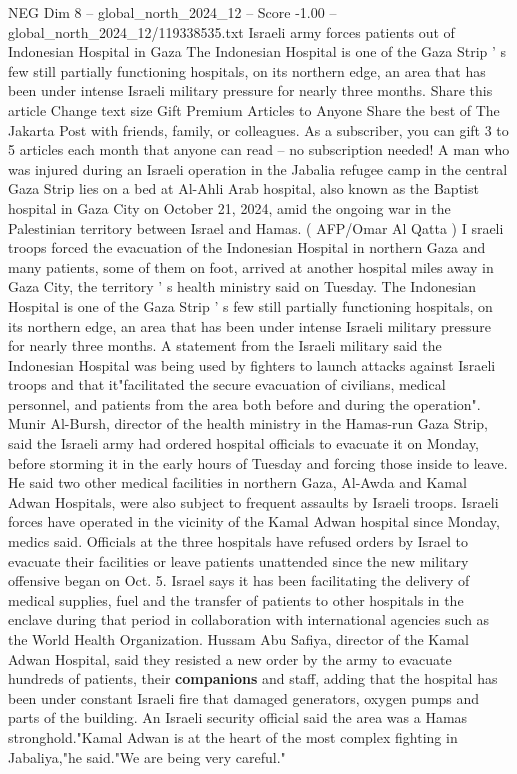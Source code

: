 \begin{textsample}{NEG Dim 8 – global\_north\_2024\_12 – Score -1.00 – global\_north\_2024\_12/119338535.txt}  \label{ex:f8_neg_114}
Israeli army forces patients out of Indonesian Hospital in Gaza The Indonesian Hospital is one of the Gaza Strip ' s few still partially functioning hospitals, on its northern edge, an area that has been under intense Israeli military pressure for nearly three months.
Share this article Change text size Gift Premium Articles to Anyone Share the best of The Jakarta Post with friends, family, or colleagues.
As a subscriber, you can gift 3 to 5 articles each month that anyone can read -- no subscription needed!
A man who was injured during an Israeli operation in the Jabalia refugee camp in the central Gaza Strip lies on a bed at Al-Ahli Arab hospital, also known as the Baptist hospital in Gaza City on October 21, 2024, amid the ongoing war in the Palestinian territory between Israel and Hamas. ( AFP/Omar Al Qatta ) I sraeli troops forced the evacuation of the Indonesian Hospital in northern Gaza and many patients, some of them on foot, arrived at another hospital miles away in Gaza City, the territory ' s health ministry said on Tuesday.
The Indonesian Hospital is one of the Gaza Strip ' s few still partially functioning hospitals, on its northern edge, an area that has been under intense Israeli military pressure for nearly three months.
A statement from the Israeli military said the Indonesian Hospital was being used by fighters to launch attacks against Israeli troops and that it"facilitated the secure evacuation of civilians, medical personnel, and patients from the area both before and during the operation".
Munir Al-Bursh, director of the health ministry in the Hamas-run Gaza Strip, said the Israeli army had ordered hospital officials to evacuate it on Monday, before storming it in the early hours of Tuesday and forcing those inside to leave.
He said two other medical facilities in northern Gaza, Al-Awda and Kamal Adwan Hospitals, were also subject to frequent assaults by Israeli troops.
Israeli forces have operated in the vicinity of the Kamal Adwan hospital since Monday, medics said.
Officials at the three hospitals have refused orders by Israel to evacuate their facilities or leave patients unattended since the new military offensive began on Oct. 5.
Israel says it has been facilitating the delivery of medical supplies, fuel and the transfer of patients to other hospitals in the enclave during that period in collaboration with international agencies such as the World Health Organization.
Hussam Abu Safiya, director of the Kamal Adwan Hospital, said they resisted a new order by the army to evacuate hundreds of patients, their \textbf{companions} and staff, adding that the hospital has been under constant Israeli fire that damaged generators, oxygen pumps and parts of the building.
An Israeli security official said the area was a Hamas stronghold."Kamal Adwan is at the heart of the most complex fighting in Jabaliya,"he said."We are being very careful."

\end{textsample}

